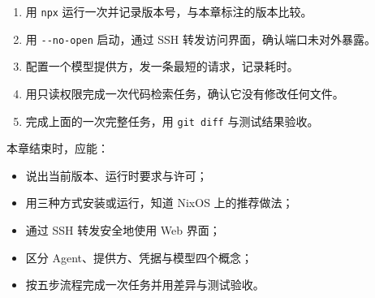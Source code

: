 \begin{enumerate}
  \item 用 \texttt{npx} 运行一次并记录版本号，与本章标注的版本比较。
  \item 用 \texttt{-{}-no-open} 启动，通过 SSH 转发访问界面，确认端口未对外暴露。
  \item 配置一个模型提供方，发一条最短的请求，记录耗时。
  \item 用只读权限完成一次代码检索任务，确认它没有修改任何文件。
  \item 完成上面的一次完整任务，用 \texttt{git diff} 与测试结果验收。
\end{enumerate}

\begin{checkpoint}
本章结束时，应能：
\begin{itemize}
  \item 说出当前版本、运行时要求与许可；
  \item 用三种方式安装或运行，知道 NixOS 上的推荐做法；
  \item 通过 SSH 转发安全地使用 Web 界面；
  \item 区分 Agent、提供方、凭据与模型四个概念；
  \item 按五步流程完成一次任务并用差异与测试验收。
\end{itemize}
\end{checkpoint}
